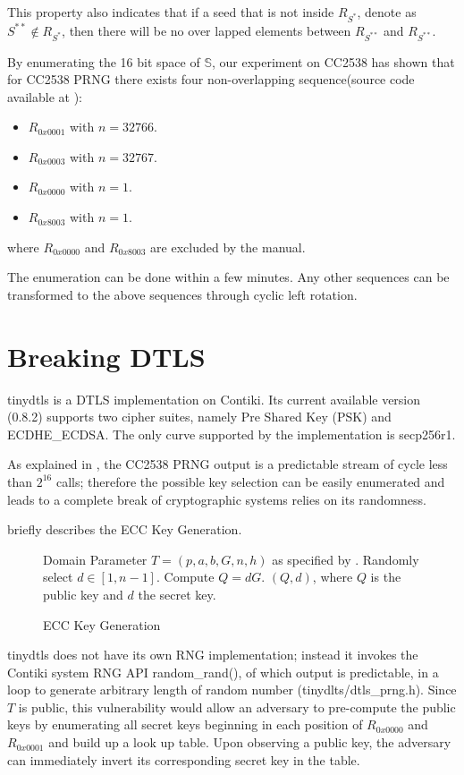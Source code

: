 This property also indicates that if a seed that is not inside $R_{S^*}$, denote as $S^{**} \notin R_{S^*}$, then there will be no over lapped elements between  $R_{S^{**}}$ and  $R_{S^{**}}$.

By enumerating the 16 bit space of $\mathbb{S}$, our experiment on CC2538 has shown that for CC2538 PRNG there exists four non-overlapping sequence(source code available at \cite{prngtest}):
\begin{itemize}
	\item $R_{0x0001}$ with $n = 32766$.
	\item $R_{0x0003}$ with $n = 32767$.
	\item $R_{0x0000}$ with $n = 1$.
	\item $R_{0x8003}$ with $n = 1$.
\end{itemize}
where $R_{0x0000}$ and $R_{0x8003}$ are excluded by the manual\cite{CC2538Manual}.

The enumeration can be done within a few minutes. Any other sequences can be transformed to the above sequences through cyclic left rotation. 

\section{Breaking DTLS} \label{BreakDTLS}
tinydtls\cite{tinydtls} is a DTLS implementation on Contiki. Its current available version\cite{tinydtls082} (0.8.2) supports two cipher suites, namely Pre Shared Key (PSK) and ECDHE\_ECDSA\cite{rfc4492}. The only curve supported by the implementation is secp256r1\cite{secp256r1}.

As explained in , the CC2538 PRNG output is a predictable stream of cycle less than $2^{16}$ calls; therefore the possible key selection can be easily enumerated and leads to a complete break of cryptographic systems relies on its randomness.    

 briefly describes the ECC Key Generation.
\begin{figure}
	\begin{algorithmic}[1]
	\scriptsize
	\REQUIRE Domain Parameter $T = (p, a, b, G, n, h)$ as specified by \cite{secp256r1}.
	\STATE Randomly select $d \in [1, n-1]$.
	\STATE Compute $Q = dG$.
	\RETURN $(Q,d)$, where $Q$ is the public key and $d$ the secret key.
	\end{algorithmic}
	\caption{ECC Key Generation}
	\label{KeyGen}
\end{figure}

tinydtls does not have its own RNG implementation; instead it invokes the Contiki system RNG API random\_rand(), of which output is predictable, in a loop to generate arbitrary length of random number (tinydlts/dtls\_prng.h). Since $T$ is public, this vulnerability would allow an adversary to pre-compute the public keys by enumerating all secret keys beginning in each position of $R_{0x0000}$ and $R_{0x0001}$ and build up a look up table. Upon observing a public key, the adversary can immediately invert its corresponding secret key in the table.

